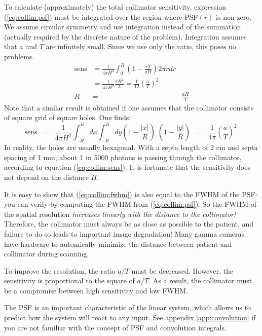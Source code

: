 \documentclass[11pt,oneside]{article}
\begin{document}
To calculate (approximately) the total collimator sensitivity, expression
(\ref{eq:collim:psf}) must be integrated over the region where PSF$(r)$ is
non-zero. We assume circular symmetry and use integration instead of the
summation (actually required by the discrete nature of the problem).
Integration assumes that $a$ and $T$ are infinitely small. Since we use only
the ratio, this poses no problems.
%
\begin{align}
\mbox{sens} &= \frac{1}{4 \pi H^2}
                  \int_0^R (1 - \frac{r T}{a H}) 2 \pi r dr \nonumber \\
            &= \frac{1}{4 \pi H^2}\frac{\pi R^2}{3}
             = \frac{1}{12} \left( \frac{a}{T} \right)^2
    \label{eq:collim:sens}\\
R & = & \frac{a H}{T} 
\label{eq:collim:fwhm}
\end{align}
%
Note that a similar result is obtained if one assumes that the
collimator consists of square grid of square holes. One finds:
\begin{equation}
\mbox{sens} \;\; = \;\;  \frac{1}{4 \pi H^2} 
  \int_{-R}^{R} dx \int_{-R}^{R} dy (1 - \frac{|x|}{R}) \; (1 -
  \frac{|y|}{R})
  \;\; = \;\; \frac{1}{4 \pi} \left( \frac{a}{T} \right)^2.
\end{equation}
In reality, the holes are usually hexagonal. With a septa length of 2
cm and septa spacing of 1 mm, about 1 in 5000 photons is passing
through the collimator, according to equation
(\ref{eq:collim:sens}). It is fortunate that the sensitivity does not
depend on the distance $H$.


It is easy to show that (\ref{eq:collim:fwhm}) is also equal to the FWHM of the
PSF: you can verify by computing the FWHM from (\ref{eq:collim:psf}). So the
FWHM of the spatial resolution {\em increases linearly with the distance to
the collimator!}  Therefore, the collimator must always be as close as
possible to the patient, and failure to do so leads to important image
degradation! Many gamma cameras have hardware to automically minimize
the distance between patient and collimator during scanning.

To improve the resolution, the ratio $a/T$ must be decreased. However, the
sensitivity is proportional to the square of $a/T$. As a result, the
collimator must be a compromise between high sensitivity and low FWHM.

The PSF is an important characteristic of the linear system, which allows us
to predict how the system will react to any input. See appendix
\ref{app:convolution} if you are not familiar with the concept of PSF and
convolution integrals.
\end{document}

